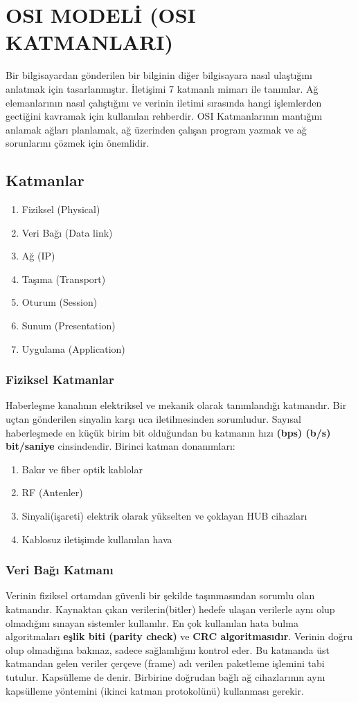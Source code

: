 \section{OSI MODELİ (OSI KATMANLARI)}
Bir bilgisayardan gönderilen bir bilginin diğer bilgisayara nasıl ulaştığını anlatmak için tasarlanmıştır.
İletişimi 7 katmanlı mimarı ile tanımlar.
Ağ elemanlarının nasıl çalıştığını ve verinin iletimi sırasında hangi işlemlerden gectiğini kavramak için kullanılan rehberdir.
OSI Katmanlarının mantığını anlamak ağları planlamak, ağ üzerinden çalışan program yazmak ve ağ sorunlarını çözmek için önemlidir.

\subsection{Katmanlar}
\begin{enumerate}
	\item Fiziksel (Physical)
	\item Veri Bağı (Data link)
	\item Ağ (IP)
	\item Taşıma (Transport)
	\item Oturum (Session)
	\item Sunum (Presentation)
	\item Uygulama (Application)
\end{enumerate}

\subsubsection{Fiziksel Katmanlar}
Haberleşme kanalının elektriksel ve mekanik olarak tanımlandığı katmandır.
Bir uçtan gönderilen sinyalin karşı uca iletilmesinden sorumludur.
Sayısal haberleşmede en küçük birim bit olduğundan bu katmanın hızı \textbf{(bps) (b/s) bit/saniye} cinsindendir.
Birinci katman donanımları:
\begin{enumerate}
	\item Bakır ve fiber optik kablolar
	\item RF (Antenler)
	\item Sinyali(işareti) elektrik olarak yükselten ve çoklayan HUB cihazları
	\item Kablosuz iletişimde kullanılan hava
\end{enumerate}

\subsubsection{Veri Bağı Katmanı}
Verinin fiziksel ortamdan güvenli bir şekilde taşınmasından sorumlu olan katmandır.
Kaynaktan çıkan verilerin(bitler) hedefe ulaşan verilerle aynı olup olmadığını sınayan sistemler kullanılır.
En çok kullanılan hata bulma algoritmaları \textbf{eşlik biti (parity check)} ve \textbf{CRC algoritmasıdır}.
Verinin doğru olup olmadığına bakmaz, sadece sağlamlığını kontrol eder.
Bu katmanda üst katmandan gelen veriler çerçeve (frame) adı verilen paketleme işlemini tabi tutulur.
Kapsülleme de denir.
Birbirine doğrudan bağlı ağ cihazlarının aynı kapsülleme yöntemini (ikinci katman protokolünü) kullanması gerekir.

